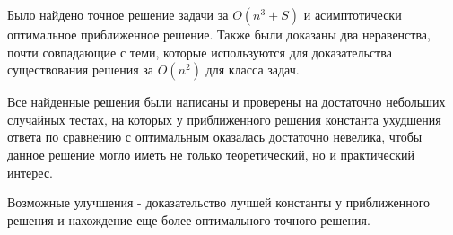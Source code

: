 Было найдено точное решение задачи за $O(n^3 + S)$ и асимптотически оптимальное приближенное решение. Также были доказаны два неравенства, почти совпадающие с теми, которые используются для доказательства существования решения за $O(n^2)$ для класса задач.

Все найденные решения были написаны и проверены на достаточно небольших случайных тестах, на которых у приближенного решения константа ухудшения ответа по сравнению с оптимальным оказалась достаточно невелика, чтобы данное решение могло иметь не только теоретический, но и практический интерес.

Возможные улучшения - доказательство лучшей константы у приближенного решения и нахождение еще более оптимального точного решения.